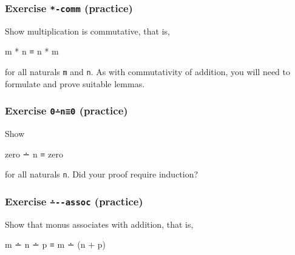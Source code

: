 \hypertarget{Induction-times-comm}{%
\subsubsection{\texorpdfstring{Exercise \texttt{*-comm}
(practice)}{Exercise *-comm (practice)}}\label{Induction-times-comm}}

Show multiplication is commutative, that is,

\begin{myDisplay}
m * n ≡ n * m
\end{myDisplay}

for all naturals \texttt{m} and \texttt{n}. As with commutativity of
addition, you will need to formulate and prove suitable lemmas.

\begin{fence}
\begin{code}%
\>[0]\<%
\end{code}
\end{fence}

\hypertarget{Induction-zero-monus}{%
\subsubsection{\texorpdfstring{Exercise \texttt{0∸n≡0}
(practice)}{Exercise 0∸n≡0 (practice)}}\label{Induction-zero-monus}}

Show

\begin{myDisplay}
zero ∸ n ≡ zero
\end{myDisplay}

for all naturals \texttt{n}. Did your proof require induction?

\begin{fence}
\begin{code}%
\>[0]\<%
\end{code}
\end{fence}

\hypertarget{Induction-monus-plus-assoc}{%
\subsubsection{\texorpdfstring{Exercise \texttt{∸-\textbar{}-assoc}
(practice)}{Exercise ∸-\textbar-assoc (practice)}}\label{Induction-monus-plus-assoc}}

Show that monus associates with addition, that is,

\begin{myDisplay}
m ∸ n ∸ p ≡ m ∸ (n + p)
\end{myDisplay}

